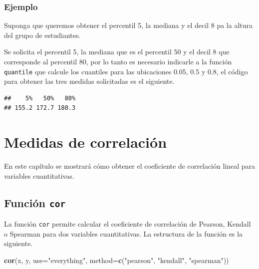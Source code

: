 \documentclass[10pt,]{krantz}
\makeatletter
\newenvironment{Shaded}{\begin{snugshade}}{\end{snugshade}}
\newcommand{\KeywordTok}[1]{\textcolor[rgb]{0.13,0.29,0.53}{\textbf{#1}}}
\newcommand{\DataTypeTok}[1]{\textcolor[rgb]{0.13,0.29,0.53}{#1}}
\newcommand{\FloatTok}[1]{\textcolor[rgb]{0.00,0.00,0.81}{#1}}
\newcommand{\StringTok}[1]{\textcolor[rgb]{0.31,0.60,0.02}{#1}}
\newcommand{\OperatorTok}[1]{\textcolor[rgb]{0.81,0.36,0.00}{\textbf{#1}}}
\newcommand{\NormalTok}[1]{#1}
\newenvironment{kframe}{%
\medskip{}
\setlength{\fboxsep}{.8em}
 \def\at@end@of@kframe{}%
 \ifinner\ifhmode%
  \def\at@end@of@kframe{\end{minipage}}%
  \begin{minipage}{\columnwidth}%
 \fi\fi%
 \def\FrameCommand##1{\hskip\@totalleftmargin \hskip-\fboxsep
 \colorbox{shadecolor}{##1}\hskip-\fboxsep
     \hskip-\linewidth \hskip-\@totalleftmargin \hskip\columnwidth}%
 \MakeFramed {\advance\hsize-\width
   \@totalleftmargin\z@ \linewidth\hsize
   \@setminipage}}%
 {\par\unskip\endMakeFramed%
 \at@end@of@kframe}
\renewenvironment{Shaded}{\begin{kframe}}{\end{kframe}}
\makeatother
\begin{document}
\subsection*{Ejemplo}\label{ejemplo-42}


Suponga que queremos obtener el percentil 5, la mediana y el decil 8 pa
la altura del grupo de estudiantes.

Se solicita el percentil 5, la mediana que es el percentil 50 y el decil
8 que corresponde al percentil 80, por lo tanto es necesario indicarle a
la función \texttt{quantile} que calcule los cuantiles para las
ubicaciones 0.05, 0.5 y 0.8, el código para obtener las tres medidas
solicitadas es el siguiente.

\begin{Shaded}
\end{Shaded}

\begin{verbatim}
##    5%   50%   80% 
## 155.2 172.7 180.3
\end{verbatim}

\chapter{\texorpdfstring{Medidas de correlación
\label{correl}}{Medidas de correlación }}\label{medidas-de-correlacion}

En este capítulo se mostrará cómo obtener el coeficiente de correlación
lineal para variables cuantitativas.

\section{\texorpdfstring{Función \texttt{cor} 
}{Función cor  }}\label{funcion-cor}

La función \texttt{cor} permite calcular el coeficiente de correlación
de Pearson, Kendall o Spearman para dos variables cuantitativas. La
estructura de la función es la siguiente.

\begin{Shaded}
\begin{Highlighting}[]
\KeywordTok{cor}\NormalTok{(x, y, }\DataTypeTok{use=}\StringTok{"everything"}\NormalTok{,}
    \DataTypeTok{method=}\KeywordTok{c}\NormalTok{(}\StringTok{"pearson"}\NormalTok{, }\StringTok{"kendall"}\NormalTok{, }\StringTok{"spearman"}\NormalTok{))}
\end{Highlighting}
\end{Shaded}
\end{document}
